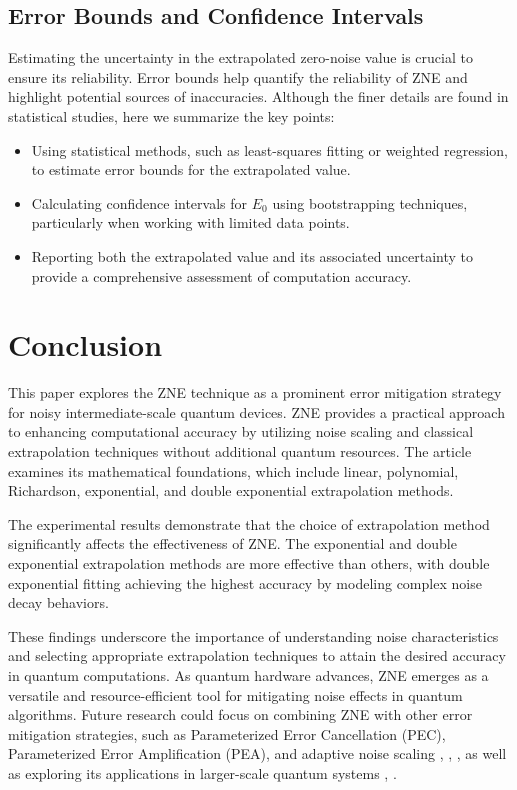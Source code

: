 \documentclass[12pt]{article}
\begin{document}
\subsection{Error Bounds and Confidence Intervals}
Estimating the uncertainty in the extrapolated zero-noise value is crucial to ensure its reliability. Error bounds help quantify the reliability of ZNE and highlight potential sources of inaccuracies. Although the finer details are found in statistical studies, here we summarize the key points:
\begin{itemize}
    \item Using statistical methods, such as least-squares fitting or weighted regression, to estimate error bounds for the extrapolated value.
    \item Calculating confidence intervals for $E_0$ using bootstrapping techniques, particularly when working with limited data points.
    \item Reporting both the extrapolated value and its associated uncertainty to provide a comprehensive assessment of computation accuracy.
\end{itemize}


\section{Conclusion}
This paper explores the ZNE technique as a prominent error mitigation strategy for noisy intermediate-scale quantum devices. ZNE provides a practical approach to enhancing computational accuracy by utilizing noise scaling and classical extrapolation techniques without additional quantum resources. The article examines its mathematical foundations, which include linear, polynomial, Richardson, exponential, and double exponential extrapolation methods.

The experimental results demonstrate that the choice of extrapolation method significantly affects the effectiveness of ZNE. The exponential and double exponential extrapolation methods are more effective than others, with double exponential fitting achieving the highest accuracy by modeling complex noise decay behaviors.

These findings underscore the importance of understanding noise characteristics and selecting appropriate extrapolation techniques to attain the desired accuracy in quantum computations. As quantum hardware advances, ZNE emerges as a versatile and resource-efficient tool for mitigating noise effects in quantum algorithms. Future research could focus on combining ZNE with other error mitigation strategies, such as Parameterized Error Cancellation (PEC), Parameterized Error Amplification (PEA), and adaptive noise scaling \cite{mod-hysRevResearch.3.033098}, \cite{mod-PhysRevA.104.052607}, \cite{mod-10313621}, as well as exploring its applications in larger-scale quantum systems \cite{app-bhattacharjee2024}, \cite{app-halder2023development}.
\end{document}
